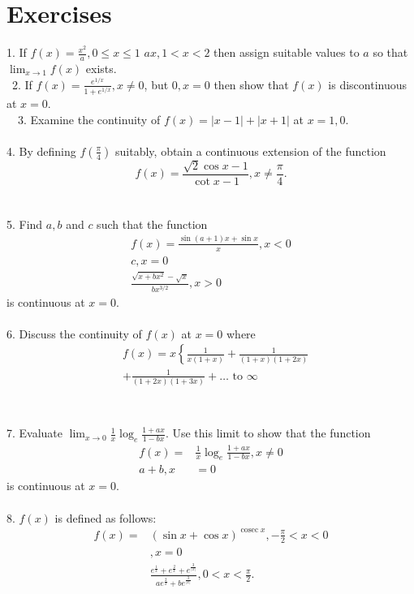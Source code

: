 

















\section{Exercises}

1. If $f(x)=\frac{x^2}{a}, 0 \leq x \leq 1$
$a x, 1<x<2$
then assign suitable values to $a$ so that $\lim _{x \rightarrow 1} f(x)$ exists.\\\
2. If $f(x)=\frac{e^{1 / x}}{1+e^{1 / x}}, x \neq 0$, but
$
0, x=0
$ then show that $f(x)$ is discontinuous at $x=0$.\\\
\
3. Examine the continuity of $f(x)=|x-1|+|x+1|$ at $x=1,0$.\\\\
4. By defining $f\left(\frac{\pi}{4}\right)$ suitably, obtain a continuous extension of the function
$$
f(x)=\frac{\sqrt{2} \cos x-1}{\cot x-1}, x \neq \frac{\pi}{4} .
$$\\\\
5. Find $a, b$ and $c$ such that the function
$$
\begin{gathered}
f(x)=\frac{\sin (a+1) x+\sin x}{x}, x<0 \\
c, x=0 \\
\frac{\sqrt{x+b x^2}-\sqrt{x}}{b x^{3 / 2}}, x>0
\end{gathered}
$$
is continuous at $x=0$.\\\\
6. Discuss the continuity of $f(x)$ at $x=0$ where
$$
\begin{aligned}
& f(x)=x\left\{\frac{1}{x(1+x)}+\frac{1}{(1+x)(1+2 x)}\right. \\
& +\frac{1}{(1+2 x)(1+3 x)}+\ldots \text { to } \infty \\
&
\end{aligned}
$$\\\\
7. Evaluate $\lim _{x \rightarrow 0} \frac{1}{x} \log _e \frac{1+a x}{1-b x}$.
Use this limit to show that the function
$$
\begin{aligned}
f(x)= & \frac{1}{x} \log _e \frac{1+a x}{1-b x}, x \neq 0 \\
a+b, x & =0
\end{aligned}
$$
is continuous at $x=0$.\\\\
8. $f(x)$ is defined as follows:
$$
\begin{aligned}
f(x)= & (\sin x+\cos x)^{\operatorname{cosec} x},-\frac{\pi}{2}<x<0 \\
& , x=0 \\
& \frac{e^{\frac{1}{x}}+e^{\frac{2}{x}}+e^{\frac{3}{|x|}}}{a e^{\frac{2}{x}}+b e^{\frac{3}{|x|}}}, 0<x<\frac{\pi}{2} .
\end{aligned}
$$

